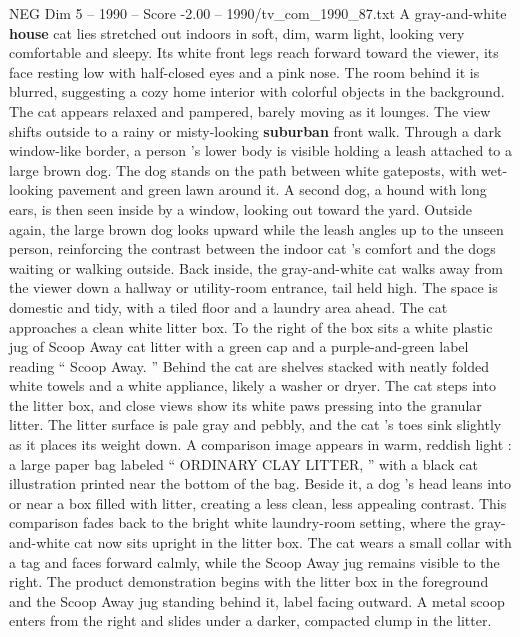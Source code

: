 \begin{textsample}{NEG Dim 5 – 1990 – Score -2.00 – 1990/tv\_com\_1990\_87.txt}  \label{ex:f5_neg_082}
A gray-and-white \textbf{house} cat lies stretched out indoors in soft, dim, warm light, looking very comfortable and sleepy.
Its white front legs reach forward toward the viewer, its face resting low with half-closed eyes and a pink nose.
The room behind it is blurred, suggesting a cozy home interior with colorful objects in the background.
The cat appears relaxed and pampered, barely moving as it lounges.
The view shifts outside to a rainy or misty-looking \textbf{suburban} front walk.
Through a dark window-like border, a person ’s lower body is visible holding a leash attached to a large brown dog.
The dog stands on the path between white gateposts, with wet-looking pavement and green lawn around it.
A second dog, a hound with long ears, is then seen inside by a window, looking out toward the yard.
Outside again, the large brown dog looks upward while the leash angles up to the unseen person, reinforcing the contrast between the indoor cat ’s comfort and the dogs waiting or walking outside.
Back inside, the gray-and-white cat walks away from the viewer down a hallway or utility-room entrance, tail held high.
The space is domestic and tidy, with a tiled floor and a laundry area ahead.
The cat approaches a clean white litter box.
To the right of the box sits a white plastic jug of Scoop Away cat litter with a green cap and a purple-and-green label reading “ Scoop Away. ” Behind the cat are shelves stacked with neatly folded white towels and a white appliance, likely a washer or dryer.
The cat steps into the litter box, and close views show its white paws pressing into the granular litter.
The litter surface is pale gray and pebbly, and the cat ’s toes sink slightly as it places its weight down.
A comparison image appears in warm, reddish light : a large paper bag labeled “ ORDINARY CLAY LITTER, ” with a black cat illustration printed near the bottom of the bag.
Beside it, a dog ’s head leans into or near a box filled with litter, creating a less clean, less appealing contrast.
This comparison fades back to the bright white laundry-room setting, where the gray-and-white cat now sits upright in the litter box.
The cat wears a small collar with a tag and faces forward calmly, while the Scoop Away jug remains visible to the right.
The product demonstration begins with the litter box in the foreground and the Scoop Away jug standing behind it, label facing outward.
A metal scoop enters from the right and slides under a darker, compacted clump in the litter.

\end{textsample}
